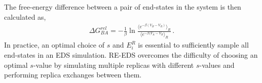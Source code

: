The free-energy difference between a pair of end-states in the system is then calculated as,
\begin{align}
    \Delta G^{rel}_{BA} = -\frac{1}{\beta}\ln\frac{\langle e^{-\beta(V_B-V_R)}\rangle_R}{\langle e^{-\beta(V_A-V_R}\rangle_R} \, .
\end{align}
In practice, an optimal choice of $s$ and $E_i^R$ is essential to sufficiently sample all end-states in an EDS simulation. RE-EDS overcomes the difficulty of choosing an optimal $s$-value by simulating multiple replicas with different $s$-values and performing replica exchanges between them.\cite{Sidler2016,Sidler2017}
